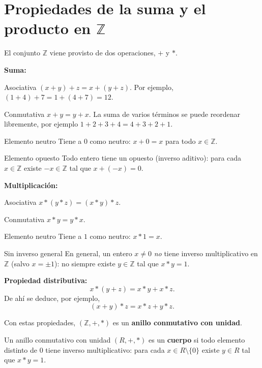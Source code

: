 \section{Propiedades de la suma y el producto en \texorpdfstring{$\mathbb{Z}$}{Z}}
\begin{teoria}
El conjunto $\mathbb{Z}$ viene provisto de dos operaciones, $+$ y $*$.

\textbf{Suma:}
\begin{listapropiedades}
    \item[Asociativa] $(x+y)+z = x+(y+z)$. Por ejemplo,
    $(1+4)+7 = 1+(4+7) = 12$.

    \item[Conmutativa] $x+y = y+x$. La suma de varios términos se puede
    reordenar libremente, por ejemplo $1+2+3+4 = 4+3+2+1$.

    \item[Elemento neutro] Tiene a $0$ como neutro: $x+0=x$ para todo
    $x \in \mathbb{Z}$.

    \item[Elemento opuesto] Todo entero tiene un opuesto (inverso
    aditivo): para cada $x \in \mathbb{Z}$ existe $-x \in \mathbb{Z}$
    tal que $x+(-x)=0$.
\end{listapropiedades}

\textbf{Multiplicación:}
\begin{listapropiedades}
    \item[Asociativa] $x*(y*z) = (x*y)*z$.

    \item[Conmutativa] $x*y = y*x$.

    \item[Elemento neutro] Tiene a $1$ como neutro: $x*1 = x$.

    \item[Sin inverso general] En general, un entero $x \neq 0$
    \emph{no} tiene inverso multiplicativo en $\mathbb{Z}$ (salvo
    $x=\pm 1$): no siempre existe $y \in \mathbb{Z}$ tal que $x*y=1$.
\end{listapropiedades}

\textbf{Propiedad distributiva:}
\[
x*(y+z) = x*y + x*z.
\]
De ahí se deduce, por ejemplo,
\[
(x+y)*z = x*z + y*z.
\]

Con estas propiedades, $(\mathbb{Z},+,*)$ es un \textbf{anillo
conmutativo con unidad}.
\end{teoria}

\begin{definicion}
Un anillo conmutativo con unidad $(R,+,*)$ es un \textbf{cuerpo} si todo
elemento distinto de $0$ tiene inverso multiplicativo: para cada
$x \in R\setminus\{0\}$ existe $y \in R$ tal que $x*y=1$.
\end{definicion}

